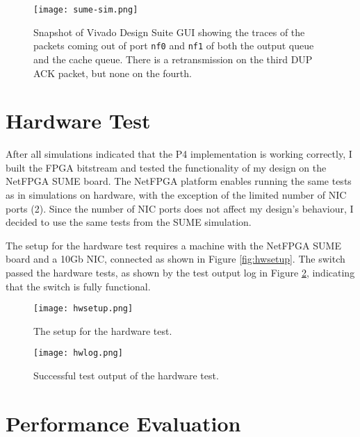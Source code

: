 \begin{figure}[!h]
	\centering
	\texttt{[image: sume-sim.png]}
	\caption{Snapshot of Vivado Design Suite GUI showing the traces of the packets coming out of port \texttt{nf0} and \texttt{nf1} of both the output queue and the cache queue. There is a retransmission on the third DUP ACK packet, but none on the fourth.}
	\label{fig:sumesim}
\end{figure}

\section{Hardware Test}
\label{sec:hwtest}
After all simulations indicated that the P4 implementation is working correctly, I built the FPGA bitstream and tested the functionality of my design on the NetFPGA SUME board. The NetFPGA platform enables running the same tests as in simulations on hardware, with the exception of the limited number of NIC ports (2). Since the number of NIC ports does not affect my design's behaviour, I decided to use the same tests from the SUME simulation. 

The setup for the hardware test requires a machine with the NetFPGA SUME board and a 10Gb NIC, connected as shown in Figure \ref{fig:hwsetup}. The switch passed the hardware tests, as shown by the test output log in Figure \ref{fig:hwlog}, indicating that the switch is fully functional.

\begin{figure}[!h]
	\begin{minipage}{.48\textwidth}
		\centering
		\texttt{[image: hwsetup.png]}
		\caption{The setup for the hardware test.}
		\label{fig:hwsetup}
	\end{minipage}
	\hfill
	\begin{minipage}{.48\textwidth}
		\centering
		\texttt{[image: hwlog.png]}
		\caption{Successful test output of the hardware test.}
		\label{fig:hwlog}
	\end{minipage}
\end{figure}

\section{Performance Evaluation}
\label{sec:eval}

